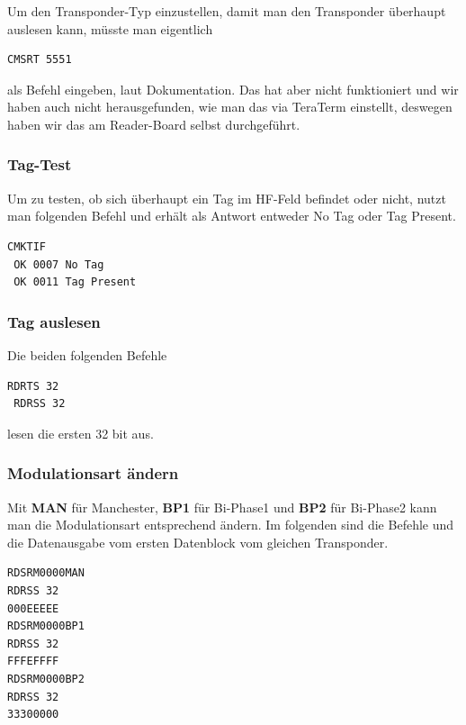 \documentclass[paper=a4,fontsize=11pt,headsepline,footsepline,parskip=half]{scrartcl}
\begin{document}
Um den Transponder-Typ einzustellen, damit man den Transponder überhaupt auslesen kann, müsste man eigentlich

\begin{lstlisting}[caption={Transponder-Typ einstellen.}]
 CMSRT 5551
\end{lstlisting}

als Befehl eingeben, laut Dokumentation. Das hat aber nicht funktioniert und wir haben auch nicht herausgefunden, wie man das via TeraTerm
einstellt, deswegen haben wir das am Reader-Board selbst durchgeführt.

\subsubsection{Tag-Test}

Um zu testen, ob sich überhaupt ein Tag im HF-Feld befindet oder nicht, nutzt man folgenden Befehl und erhält als Antwort entweder \glqq 
No Tag\grqq{} oder \glqq Tag Present\grqq.

\begin{lstlisting}[caption={Vorhandensein des Tags im HF-Feld testen.}]
 CMKTIF
 OK 0007 No Tag
 OK 0011 Tag Present
\end{lstlisting}

\subsubsection{Tag auslesen}

Die beiden folgenden Befehle

\begin{lstlisting}[caption={Tag auslesen.}]
 RDRTS 32
 RDRSS 32
\end{lstlisting}

lesen die ersten 32 bit aus.

\subsubsection{Modulationsart ändern}

Mit \textbf{MAN} für \glqq Manchester\grqq{}, \textbf{BP1} für \glqq Bi-Phase1\grqq{} und \textbf{BP2} für \glqq Bi-Phase2\grqq{} kann
man die Modulationsart entsprechend ändern. Im folgenden sind die Befehle und die Datenausgabe vom ersten Datenblock vom gleichen
Transponder.

\begin{lstlisting}[caption={Modulationsart ändern und Ausgabe anzeigen.}]
RDSRM0000MAN
RDRSS 32
000EEEEE
RDSRM0000BP1
RDRSS 32
FFFEFFFF
RDSRM0000BP2
RDRSS 32
33300000
\end{lstlisting}
\end{document}
